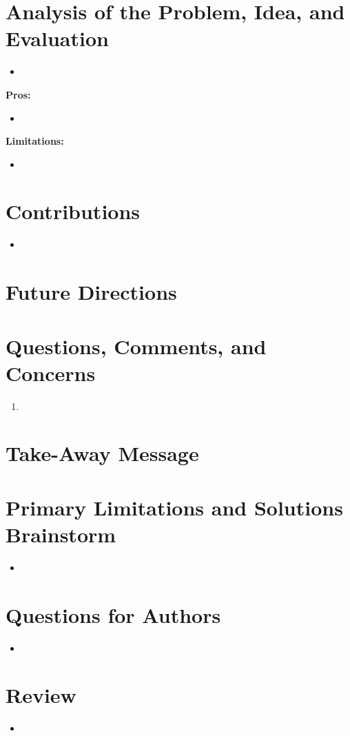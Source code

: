 \documentclass[letterpaper,10pt]{article}
\begin{document}
\section{Analysis of the Problem, Idea, and Evaluation}
  \begin{itemize} 
    \item 
  \end{itemize}
  
  \noindent\textbf{Pros:}
    \begin{itemize}
        \item 
    \end{itemize}

  \noindent\textbf{Limitations:}
    \begin{itemize} 
      \item 
    \end{itemize}    

\section{Contributions}

	\begin{itemize}
		\item 
	\end{itemize}

\section{Future Directions}

\section{Questions, Comments, and Concerns}
  \begin{enumerate}   
  	\item
  \end{enumerate}

\section{Take-Away Message}

\section{Primary Limitations and Solutions Brainstorm}

\begin{itemize}
  \item  
\end{itemize}

\section{Questions for Authors}
\begin{itemize}
  \item 
\end{itemize}

\section{Review}
  \renewcommand{\labelitemi}{$\circ$} 
  \begin{itemize}
    \item  
  \end{itemize}
  \renewcommand{\labelitemi}{$\bullet$} 
\end{document}

